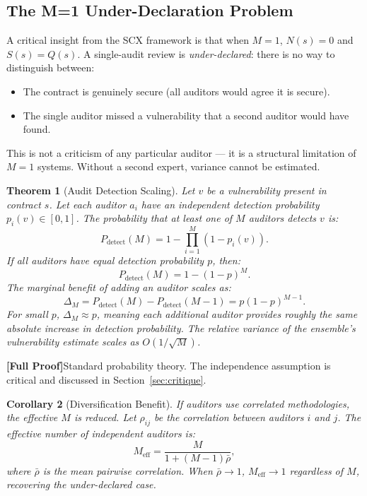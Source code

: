 \documentclass[12pt,a4paper]{article}
\newtheorem{theorem}{Theorem}[section]
\newtheorem{corollary}[theorem]{Corollary}
\theoremstyle{remark}
\newcommand{\rigorFull}{\textbf{[Full Proof]}}
\begin{document}
\subsection{The M=1 Under-Declaration Problem}

A critical insight from the SCX framework is that when $M=1$, $N(s)=0$ and
$S(s)=Q(s)$. A single-audit review is \emph{under-declared}: there is no way
to distinguish between:
\begin{itemize}
\item The contract is genuinely secure (all auditors would agree it is secure).
\item The single auditor missed a vulnerability that a second auditor would
have found.
\end{itemize}

This is not a criticism of any particular auditor --- it is a structural
limitation of $M=1$ systems. Without a second expert, variance cannot be
estimated.

\begin{theorem}[Audit Detection Scaling]
\label{thm:audit_scaling}
Let $v$ be a vulnerability present in contract $s$. Let each auditor $a_i$ have
an independent detection probability $p_i(v) \in [0,1]$. The probability that
at least one of $M$ auditors detects $v$ is:
\begin{equation}
P_{\text{detect}}(M) = 1 - \prod_{i=1}^M (1 - p_i(v)).
\label{eq:audit_detect}
\end{equation}
If all auditors have equal detection probability $p$, then:
\begin{equation}
P_{\text{detect}}(M) = 1 - (1-p)^M.
\label{eq:audit_detect_equal}
\end{equation}
The marginal benefit of adding an auditor scales as:
\begin{equation}
\Delta_M = P_{\text{detect}}(M) - P_{\text{detect}}(M-1) = p(1-p)^{M-1}.
\label{eq:audit_marginal}
\end{equation}
For small $p$, $\Delta_M \approx p$, meaning each additional auditor provides
roughly the same absolute increase in detection probability. The relative
variance of the ensemble's vulnerability estimate scales as $O(1/\sqrt{M})$.
\end{theorem}

\rigorFull Standard probability theory. The independence assumption is
critical and discussed in Section~\ref{sec:critique}.

\begin{corollary}[Diversification Benefit]
\label{cor:audit_diversify}
If auditors use correlated methodologies, the effective $M$ is reduced. Let
$\rho_{ij}$ be the correlation between auditors $i$ and $j$. The effective
number of independent auditors is:
\begin{equation}
M_{\text{eff}} = \frac{M}{1 + (M-1)\bar{\rho}},
\label{eq:meff}
\end{equation}
where $\bar{\rho}$ is the mean pairwise correlation. When $\bar{\rho} \to 1$,
$M_{\text{eff}} \to 1$ regardless of $M$, recovering the under-declared case.
\end{corollary}
\end{document}

